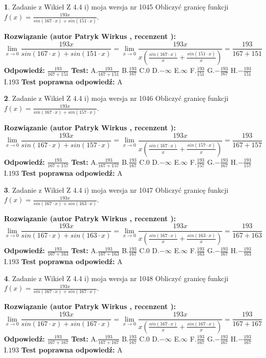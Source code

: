 \documentclass[12pt, a4paper]{article}
\theoremstyle{definition} %
\newtheorem{zad}{}
\newcommand{\zadStart}[1]{\begin{zad}#1\newline}
\newcommand{\zadStop}{\end{zad}}
\newcommand{\rozwStart}[2]{\noindent \textbf{Rozwiązanie (autor #1 , recenzent #2): }\newline}
\newcommand{\rozwStop}{\newline}
\newcommand{\odpStart}{\noindent \textbf{Odpowiedź:}\newline}
\newcommand{\odpStop}{\newline}
\newcommand{\testStart}{\noindent \textbf{Test:}\newline}
\newcommand{\testStop}{\newline}
\newcommand{\kluczStart}{\noindent \textbf{Test poprawna odpowiedź:}\newline}
\newcommand{\kluczStop}{\newline}
\begin{document}
\zadStart{Zadanie z Wikieł Z 4.4 i) moja wersja nr 1045}
Obliczyć granicę funkcji $f(x)=\frac{193x}{sin(167\cdot x) +sin(151\cdot x)}$.
\zadStop
\rozwStart{Patryk Wirkus}{}
$$\lim\limits_{x\to 0}\frac{193x}{sin(167\cdot x) +sin(151\cdot x)}=\lim\limits_{x\to 0}\frac{193x}{x(\frac{sin(167\cdot x)}{x}+\frac{sin(151\cdot x)}{x})}=\frac{193}{167+151}$$
\rozwStop
\odpStart
$\frac{193}{167+151}$
\odpStop
\testStart
A.$\frac{193}{167+151}$
B.$\frac{193}{167}$
C.$0$
D.$-\infty$
E.$\infty$
F.$\frac{193}{151}$
G.$-\frac{193}{167}$
H.$-\frac{193}{151}$
I.$193$
\testStop
\kluczStart
A
\kluczStop



\zadStart{Zadanie z Wikieł Z 4.4 i) moja wersja nr 1046}
Obliczyć granicę funkcji $f(x)=\frac{193x}{sin(167\cdot x) +sin(157\cdot x)}$.
\zadStop
\rozwStart{Patryk Wirkus}{}
$$\lim\limits_{x\to 0}\frac{193x}{sin(167\cdot x) +sin(157\cdot x)}=\lim\limits_{x\to 0}\frac{193x}{x(\frac{sin(167\cdot x)}{x}+\frac{sin(157\cdot x)}{x})}=\frac{193}{167+157}$$
\rozwStop
\odpStart
$\frac{193}{167+157}$
\odpStop
\testStart
A.$\frac{193}{167+157}$
B.$\frac{193}{167}$
C.$0$
D.$-\infty$
E.$\infty$
F.$\frac{193}{157}$
G.$-\frac{193}{167}$
H.$-\frac{193}{157}$
I.$193$
\testStop
\kluczStart
A
\kluczStop



\zadStart{Zadanie z Wikieł Z 4.4 i) moja wersja nr 1047}
Obliczyć granicę funkcji $f(x)=\frac{193x}{sin(167\cdot x) +sin(163\cdot x)}$.
\zadStop
\rozwStart{Patryk Wirkus}{}
$$\lim\limits_{x\to 0}\frac{193x}{sin(167\cdot x) +sin(163\cdot x)}=\lim\limits_{x\to 0}\frac{193x}{x(\frac{sin(167\cdot x)}{x}+\frac{sin(163\cdot x)}{x})}=\frac{193}{167+163}$$
\rozwStop
\odpStart
$\frac{193}{167+163}$
\odpStop
\testStart
A.$\frac{193}{167+163}$
B.$\frac{193}{167}$
C.$0$
D.$-\infty$
E.$\infty$
F.$\frac{193}{163}$
G.$-\frac{193}{167}$
H.$-\frac{193}{163}$
I.$193$
\testStop
\kluczStart
A
\kluczStop



\zadStart{Zadanie z Wikieł Z 4.4 i) moja wersja nr 1048}
Obliczyć granicę funkcji $f(x)=\frac{193x}{sin(167\cdot x) +sin(167\cdot x)}$.
\zadStop
\rozwStart{Patryk Wirkus}{}
$$\lim\limits_{x\to 0}\frac{193x}{sin(167\cdot x) +sin(167\cdot x)}=\lim\limits_{x\to 0}\frac{193x}{x(\frac{sin(167\cdot x)}{x}+\frac{sin(167\cdot x)}{x})}=\frac{193}{167+167}$$
\rozwStop
\odpStart
$\frac{193}{167+167}$
\odpStop
\testStart
A.$\frac{193}{167+167}$
B.$\frac{193}{167}$
C.$0$
D.$-\infty$
E.$\infty$
F.$\frac{193}{167}$
G.$-\frac{193}{167}$
H.$-\frac{193}{167}$
I.$193$
\testStop
\kluczStart
A
\kluczStop
\end{document}
